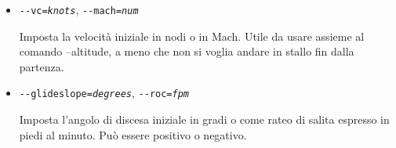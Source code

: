 {\begin{itemize}
  Imposta la velocit\`{a} iniziale lungo i punti cardinali e gli assi verticali.
  La velocit\`{a} \`{e} in piedi/metri al secondo in base a quale unit\`{a} di misura \`{e} stata scelta nelle impostazioni.

  \item{\texttt{-$ $-vc={\it knots}}, \texttt{-$ $-mach={\it num}}}

  Imposta la velocit\`{a} iniziale in nodi o in Mach. Utile da usare assieme al comando --altitude, a meno che non
  si voglia andare in stallo fin dalla partenza.

  \item{\texttt{-$ $-glideslope={\it degrees}}, \texttt{-$ $-roc={\it fpm}}}

  Imposta l'angolo di discesa iniziale in gradi o come rateo di salita espresso in piedi al minuto.
  Pu\`{o} essere positivo o negativo.

  \end{itemize}
}

